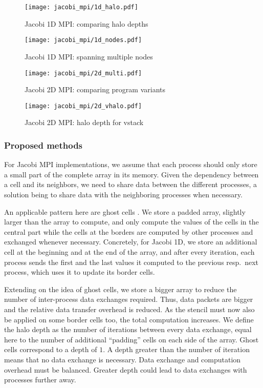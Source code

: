 \begin{figure}
  \texttt{[image: jacobi\_mpi/1d\_halo.pdf]}
  \caption{Jacobi 1D MPI: comparing halo depths}
  \label{fig:j1d_halo}
\end{figure}
\begin{figure}
  \texttt{[image: jacobi\_mpi/1d\_nodes.pdf]}
  \caption{Jacobi 1D MPI: spanning multiple nodes}
  \label{fig:j1d_nodes}
\end{figure}
\begin{figure}
  \texttt{[image: jacobi\_mpi/2d\_multi.pdf]}
  \caption{Jacobi 2D MPI: comparing program variants}
  \label{fig:j2d_multi}
\end{figure}
\begin{figure}
  \texttt{[image: jacobi\_mpi/2d\_vhalo.pdf]}
  \caption{Jacobi 2D MPI: halo depth for vstack}
  \label{fig:j2d_vhalo}
\end{figure}

\subsubsection{Proposed methods}\label{jacobi_mpi_methods}
For Jacobi MPI implementations, we assume that each process should only store a small part of the complete array in its memory.
Given the dependency between a cell and its neighbors, we need to share data between the different processes, a solution being to share data with the neighboring processes when necessary.

 An applicable pattern here are ghost cells \cite{ghost_cells}.
We store a padded array, slightly larger than the array to compute, and only compute the values of the cells in the central part while the cells at the borders are computed by other processes and exchanged whenever necessary.
Concretely, for Jacobi 1D, we store an additional cell at the beginning and at the end of the array, and
after every iteration, each process sends the first and the last values it computed to the previous resp.~next process, which uses it to update its border cells.

 Extending on the idea of ghost cells, we store a bigger array to reduce the number of inter-process data exchanges required.
Thus, data packets are bigger and the relative data transfer overhead is reduced.
As the stencil must now also be applied on some border cells too, the total computation increases.
We define the halo depth as the number of iterations between every data exchange, equal here to the number of additional ``padding'' cells on each side of the array.
Ghost cells correspond to a depth of $1$.
A depth greater than the number of iteration means that no data exchange is necessary.
Data exchange and computation overhead must be balanced.
Greater depth could lead to data exchanges with processes further away.

